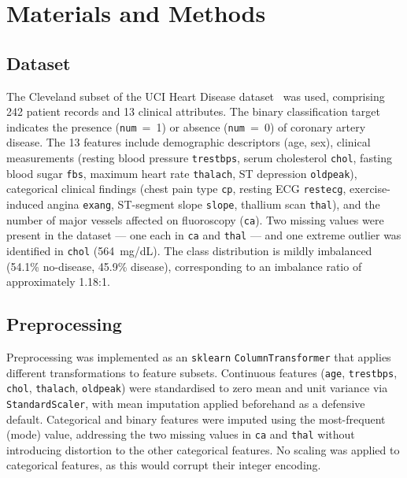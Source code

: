 \section{Materials and Methods}
\label{sec:methods}

\subsection{Dataset}
\label{sec:dataset}

The Cleveland subset of the UCI Heart Disease dataset~\cite{detrano1989cleveland} was used, comprising 242 patient records and 13 clinical attributes. The binary classification target indicates the presence (\texttt{num}~=~1) or absence (\texttt{num}~=~0) of coronary artery disease. The 13 features include demographic descriptors (age, sex), clinical measurements (resting blood pressure \texttt{trestbps}, serum cholesterol \texttt{chol}, fasting blood sugar \texttt{fbs}, maximum heart rate \texttt{thalach}, ST depression \texttt{oldpeak}), categorical clinical findings (chest pain type \texttt{cp}, resting ECG \texttt{restecg}, exercise-induced angina \texttt{exang}, ST-segment slope \texttt{slope}, thallium scan \texttt{thal}), and the number of major vessels affected on fluoroscopy (\texttt{ca}). Two missing values were present in the dataset --- one each in \texttt{ca} and \texttt{thal} --- and one extreme outlier was identified in \texttt{chol} (564~mg/dL). The class distribution is mildly imbalanced (54.1\% no-disease, 45.9\% disease), corresponding to an imbalance ratio of approximately 1.18:1.

\subsection{Preprocessing}
\label{sec:preprocessing}

Preprocessing was implemented as an \texttt{sklearn} \texttt{ColumnTransformer} that applies different transformations to feature subsets. Continuous features (\texttt{age}, \texttt{trestbps}, \texttt{chol}, \texttt{thalach}, \texttt{oldpeak}) were standardised to zero mean and unit variance via \texttt{StandardScaler}, with mean imputation applied beforehand as a defensive default. Categorical and binary features were imputed using the most-frequent (mode) value, addressing the two missing values in \texttt{ca} and \texttt{thal} without introducing distortion to the other categorical features. No scaling was applied to categorical features, as this would corrupt their integer encoding.

